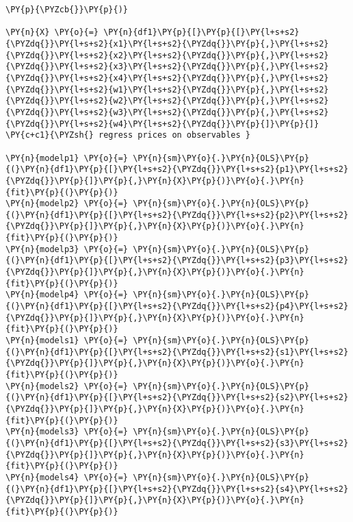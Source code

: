 \begin{tcolorbox}[breakable, size=fbox, boxrule=1pt, pad at break*=1mm,colback=cellbackground, colframe=cellborder]
\begin{Verbatim}[commandchars=\\\{\}]
\PY{p}{\PYZcb{}}\PY{p}{)}

\PY{n}{X} \PY{o}{=} \PY{n}{df1}\PY{p}{[}\PY{p}{[}\PY{l+s+s2}{\PYZdq{}}\PY{l+s+s2}{x1}\PY{l+s+s2}{\PYZdq{}}\PY{p}{,}\PY{l+s+s2}{\PYZdq{}}\PY{l+s+s2}{x2}\PY{l+s+s2}{\PYZdq{}}\PY{p}{,}\PY{l+s+s2}{\PYZdq{}}\PY{l+s+s2}{x3}\PY{l+s+s2}{\PYZdq{}}\PY{p}{,}\PY{l+s+s2}{\PYZdq{}}\PY{l+s+s2}{x4}\PY{l+s+s2}{\PYZdq{}}\PY{p}{,}\PY{l+s+s2}{\PYZdq{}}\PY{l+s+s2}{w1}\PY{l+s+s2}{\PYZdq{}}\PY{p}{,}\PY{l+s+s2}{\PYZdq{}}\PY{l+s+s2}{w2}\PY{l+s+s2}{\PYZdq{}}\PY{p}{,}\PY{l+s+s2}{\PYZdq{}}\PY{l+s+s2}{w3}\PY{l+s+s2}{\PYZdq{}}\PY{p}{,}\PY{l+s+s2}{\PYZdq{}}\PY{l+s+s2}{w4}\PY{l+s+s2}{\PYZdq{}}\PY{p}{]}\PY{p}{]}
\PY{c+c1}{\PYZsh{} regress prices on observables }

\PY{n}{modelp1} \PY{o}{=} \PY{n}{sm}\PY{o}{.}\PY{n}{OLS}\PY{p}{(}\PY{n}{df1}\PY{p}{[}\PY{l+s+s2}{\PYZdq{}}\PY{l+s+s2}{p1}\PY{l+s+s2}{\PYZdq{}}\PY{p}{]}\PY{p}{,}\PY{n}{X}\PY{p}{)}\PY{o}{.}\PY{n}{fit}\PY{p}{(}\PY{p}{)}
\PY{n}{modelp2} \PY{o}{=} \PY{n}{sm}\PY{o}{.}\PY{n}{OLS}\PY{p}{(}\PY{n}{df1}\PY{p}{[}\PY{l+s+s2}{\PYZdq{}}\PY{l+s+s2}{p2}\PY{l+s+s2}{\PYZdq{}}\PY{p}{]}\PY{p}{,}\PY{n}{X}\PY{p}{)}\PY{o}{.}\PY{n}{fit}\PY{p}{(}\PY{p}{)}
\PY{n}{modelp3} \PY{o}{=} \PY{n}{sm}\PY{o}{.}\PY{n}{OLS}\PY{p}{(}\PY{n}{df1}\PY{p}{[}\PY{l+s+s2}{\PYZdq{}}\PY{l+s+s2}{p3}\PY{l+s+s2}{\PYZdq{}}\PY{p}{]}\PY{p}{,}\PY{n}{X}\PY{p}{)}\PY{o}{.}\PY{n}{fit}\PY{p}{(}\PY{p}{)}
\PY{n}{modelp4} \PY{o}{=} \PY{n}{sm}\PY{o}{.}\PY{n}{OLS}\PY{p}{(}\PY{n}{df1}\PY{p}{[}\PY{l+s+s2}{\PYZdq{}}\PY{l+s+s2}{p4}\PY{l+s+s2}{\PYZdq{}}\PY{p}{]}\PY{p}{,}\PY{n}{X}\PY{p}{)}\PY{o}{.}\PY{n}{fit}\PY{p}{(}\PY{p}{)}
\PY{n}{models1} \PY{o}{=} \PY{n}{sm}\PY{o}{.}\PY{n}{OLS}\PY{p}{(}\PY{n}{df1}\PY{p}{[}\PY{l+s+s2}{\PYZdq{}}\PY{l+s+s2}{s1}\PY{l+s+s2}{\PYZdq{}}\PY{p}{]}\PY{p}{,}\PY{n}{X}\PY{p}{)}\PY{o}{.}\PY{n}{fit}\PY{p}{(}\PY{p}{)}
\PY{n}{models2} \PY{o}{=} \PY{n}{sm}\PY{o}{.}\PY{n}{OLS}\PY{p}{(}\PY{n}{df1}\PY{p}{[}\PY{l+s+s2}{\PYZdq{}}\PY{l+s+s2}{s2}\PY{l+s+s2}{\PYZdq{}}\PY{p}{]}\PY{p}{,}\PY{n}{X}\PY{p}{)}\PY{o}{.}\PY{n}{fit}\PY{p}{(}\PY{p}{)}
\PY{n}{models3} \PY{o}{=} \PY{n}{sm}\PY{o}{.}\PY{n}{OLS}\PY{p}{(}\PY{n}{df1}\PY{p}{[}\PY{l+s+s2}{\PYZdq{}}\PY{l+s+s2}{s3}\PY{l+s+s2}{\PYZdq{}}\PY{p}{]}\PY{p}{,}\PY{n}{X}\PY{p}{)}\PY{o}{.}\PY{n}{fit}\PY{p}{(}\PY{p}{)}
\PY{n}{models4} \PY{o}{=} \PY{n}{sm}\PY{o}{.}\PY{n}{OLS}\PY{p}{(}\PY{n}{df1}\PY{p}{[}\PY{l+s+s2}{\PYZdq{}}\PY{l+s+s2}{s4}\PY{l+s+s2}{\PYZdq{}}\PY{p}{]}\PY{p}{,}\PY{n}{X}\PY{p}{)}\PY{o}{.}\PY{n}{fit}\PY{p}{(}\PY{p}{)}
\end{Verbatim}
\end{tcolorbox}

